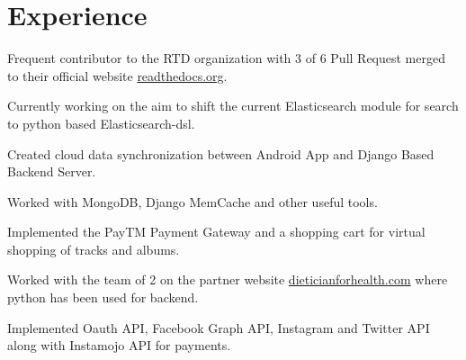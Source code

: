\documentclass[]{openfont}
\begin{document}
\hfill
\begin{minipage}[t]{0.66\textwidth} 


\section{Experience}

\vspace{\topsep} %
\begin{tightemize}
\item Frequent contributor to the RTD organization with 3 of 6 Pull Request merged to their official website \href{https://readthedocs.org}{readthedocs.org}. 
\item Currently working on the aim to shift the current Elasticsearch module for search to python based Elasticsearch-dsl.
\end{tightemize}
\sectionsep

\begin{tightemize}
\item Created cloud data synchronization between Android App and Django Based Backend Server.
\item Worked with MongoDB, Django MemCache and other useful tools.
\item Implemented the PayTM Payment Gateway and a shopping cart for virtual shopping of tracks and albums.
\end{tightemize}
\sectionsep

\begin{tightemize}
\item Worked with the team of 2 on the partner website \href{http://www.dieticianforhealth.com}{dieticianforhealth.com} where python has been used for backend.
\item Implemented Oauth API, Facebook Graph API, Instagram and Twitter API along with Instamojo API for payments.
\end{tightemize}
\sectionsep


\end{minipage}
\end{document}

